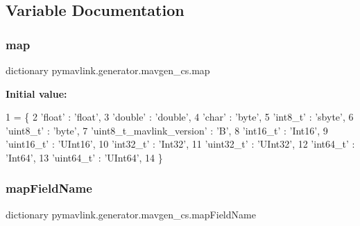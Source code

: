 \subsection{Variable Documentation}
\mbox{\label{namespacepymavlink_1_1generator_1_1mavgen__cs_ae949f75fb520f4e00cfb374dd701dfb2}} 
\subsubsection{\texorpdfstring{map}{map}}
{\footnotesize\ttfamily dictionary pymavlink.\+generator.\+mavgen\+\_\+cs.\+map}

{\bfseries Initial value\+:}
\begin{DoxyCode}
1 =  \{
2         \textcolor{stringliteral}{'float'}    : \textcolor{stringliteral}{'float'},
3         \textcolor{stringliteral}{'double'}   : \textcolor{stringliteral}{'double'},
4         \textcolor{stringliteral}{'char'}     : \textcolor{stringliteral}{'byte'},
5         \textcolor{stringliteral}{'int8\_t'}   : \textcolor{stringliteral}{'sbyte'},
6         \textcolor{stringliteral}{'uint8\_t'}  : \textcolor{stringliteral}{'byte'},
7         \textcolor{stringliteral}{'uint8\_t\_mavlink\_version'}  : \textcolor{stringliteral}{'B'},
8         \textcolor{stringliteral}{'int16\_t'}  : \textcolor{stringliteral}{'Int16'},
9         \textcolor{stringliteral}{'uint16\_t'} : \textcolor{stringliteral}{'UInt16'},
10         \textcolor{stringliteral}{'int32\_t'}  : \textcolor{stringliteral}{'Int32'},
11         \textcolor{stringliteral}{'uint32\_t'} : \textcolor{stringliteral}{'UInt32'},
12         \textcolor{stringliteral}{'int64\_t'}  : \textcolor{stringliteral}{'Int64'},
13         \textcolor{stringliteral}{'uint64\_t'} : \textcolor{stringliteral}{'UInt64'},
14         \}
\end{DoxyCode}
\mbox{\label{namespacepymavlink_1_1generator_1_1mavgen__cs_a1ac6d29c09535167fbefeeec15f67a4e}} 
\subsubsection{\texorpdfstring{map\+Field\+Name}{mapFieldName}}
{\footnotesize\ttfamily dictionary pymavlink.\+generator.\+mavgen\+\_\+cs.\+map\+Field\+Name}

